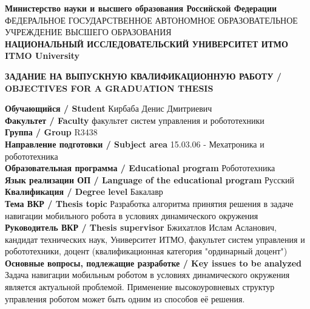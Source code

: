 \thispagestyle{empty}
\begin{small}
\begin{center}
    \textbf{Министерство науки и высшего образования Российской Федерации} \\
    ФЕДЕРАЛЬНОЕ ГОСУДАРСТВЕННОЕ АВТОНОМНОЕ ОБРАЗОВАТЕЛЬНОЕ \\
    УЧРЕЖДЕНИЕ ВЫСШЕГО ОБРАЗОВАНИЯ \\
    \textbf{НАЦИОНАЛЬНЫЙ ИССЛЕДОВАТЕЛЬСКИЙ УНИВЕРСИТЕТ ИТМО} \\
    \textbf{ITMO University}

    \vspace{25pt}

    \textbf{ЗАДАНИЕ НА ВЫПУСКНУЮ КВАЛИФИКАЦИОННУЮ РАБОТУ / \\
    OBJECTIVES FOR A GRADUATION THESIS}

    \vspace{25pt}

\end{center}

\noindent
\textbf{Обучающийся / Student} Кирбаба Денис Дмитриевич \\
\textbf{Факультет / Faculty} факультет систем управления и робототехники \\
\textbf{Группа / Group} R3438 \\
\textbf{Направление подготовки / Subject area} 15.03.06 - Мехатроника и робототехника \\
\textbf{Образовательная программа / Educational program} Робототехника \\
\textbf{Язык реализации ОП / Language of the educational program} Русский \\
\textbf{Квалификация / Degree level} Бакалавр \\
\textbf{Тема ВКР / Thesis topic} Разработка алгоритма принятия решения в задаче навигации мобильного робота в условиях динамического окружения \\
\textbf{Руководитель ВКР / Thesis supervisor} Бжихатлов Ислам Асланович, кандидат технических наук, Университет ИТМО, факультет систем управления и робототехники, доцент (квалификационная категория "ординарный доцент") \\

\noindent
\textbf{Основные вопросы, подлежащие разработке / Key issues to be analyzed} \\
\noindent
Задача навигации мобильным роботом в условиях динамического окружения является актуальной проблемой. Применение высокоуровневых структур управления роботом может быть одним из способов её решения. \\


\end{small}
